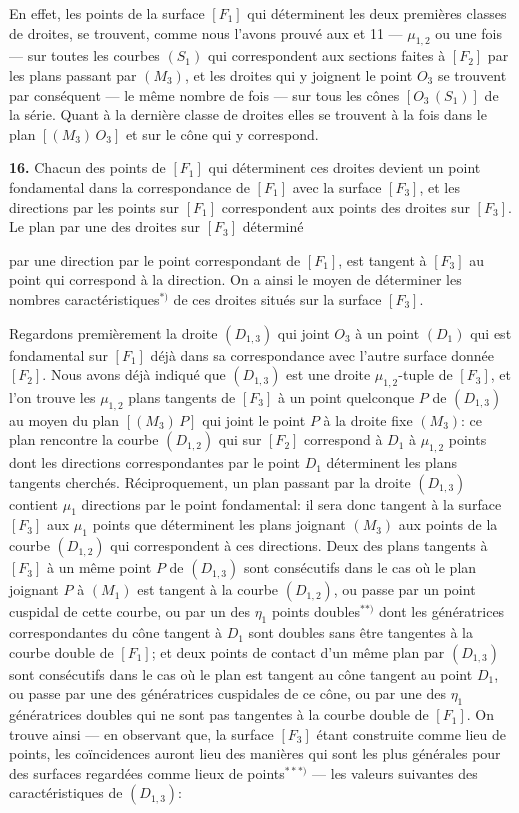 \documentclass{article}
\begin{document}
En effet, les points de la surface $[F_1]$ qui déterminent les deux premières classes de droites, se trouvent, comme nous l'avons prouvé aux  et 11 --- $\mu_{1, 2}$ ou une fois --- sur toutes les courbes $(S_1)$ qui correspondent aux sections faites à $[F_2]$ par les plans passant par $(M_3)$, et les droites qui y joignent le point $O_3$ se trouvent par conséquent --- le même nombre de fois --- sur tous les cônes $[O_3\,(S_1)]$ de la série. Quant à la dernière classe de droites elles se trouvent à la fois dans le plan $[(M_3)\,O_3]$ et sur le cône qui y correspond.

\textbf{16.} Chacun des points de $[F_1]$ qui déterminent ces droites devient un point fondamental dans la correspondance de $[F_1]$ avec la surface $[F_3]$, et les directions par les points sur $[F_1]$ correspondent aux points des droites sur $[F_3]$. Le plan par une des droites sur $[F_3]$ déterminé

par une direction par le point correspondant de $[F_1]$, est tangent à $[F_3]$ au point qui correspond à la direction. On a ainsi le moyen de déterminer les nombres caractéristiques${}^{*)}$ de ces droites situés sur la surface $[F_3]$.

Regardons premièrement la droite $(D_{1, 3})$ qui joint $O_3$ à un point $(D_1)$ qui est fondamental sur $[F_1]$ déjà dans sa correspondance avec l'autre surface donnée $[F_2]$. Nous avons déjà indiqué que $(D_{1, 3})$ est une droite $\mu_{1, 2}$-tuple de $[F_3]$, et l'on trouve les $\mu_{1, 2}$ plans tangents de $[F_3]$ à un point quelconque $P$ de $(D_{1, 3})$ au moyen du plan $[(M_3)\,P]$ qui joint le point $P$ à la droite fixe $(M_3)$: ce plan rencontre la courbe $(D_{1, 2})$ qui sur $[F_2]$ correspond à $D_1$ à $\mu_{1, 2}$ points dont les directions correspondantes par le point $D_1$ déterminent les plans tangents cherchés. Réciproquement, un plan passant par la droite $(D_{1, 3})$ contient $\mu_1$ directions par le point fondamental: il sera donc tangent à la surface $[F_3]$ aux $\mu_1$ points que déterminent les plans joignant $(M_3)$ aux points de la courbe $(D_{1, 2})$ qui correspondent à ces directions. Deux des plans tangents à $[F_3]$ à un même point $P$ de $(D_{1, 3})$ sont consécutifs dans le cas où le plan joignant $P$ à $(M_1)$ est tangent à la courbe $(D_{1, 2})$, ou passe par un point cuspidal de cette courbe, ou par un des $\eta_1$ points doubles${}^{**)}$ dont les génératrices correspondantes du cône tangent à $D_1$ sont doubles sans être tangentes à la courbe double de $[F_1]$; et deux points de contact d'un même plan par $(D_{1, 3})$ sont consécutifs dans le cas où le plan est tangent au cône tangent au point $D_1$, ou passe par une des génératrices cuspidales de ce cône, ou par une des $\eta_1$ génératrices doubles qui ne sont pas tangentes à la courbe double de $[F_1]$. On trouve ainsi --- en observant que, la surface $[F_3]$ étant construite comme lieu de points, les coïncidences auront lieu des manières qui sont les plus générales pour des surfaces regardées comme lieux de points${}^{***)}$ --- les valeurs suivantes des caractéristiques de $(D_{1, 3})$:
\end{document}

